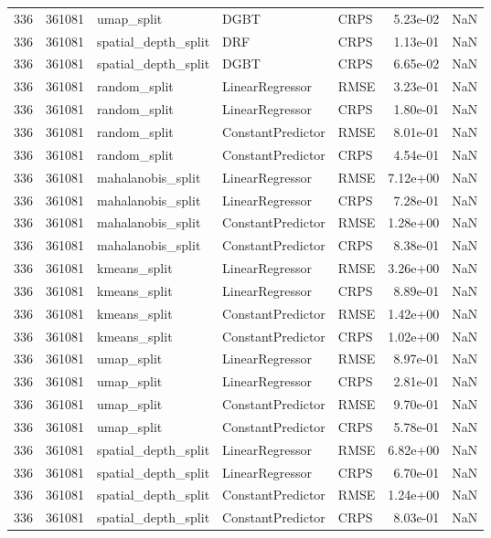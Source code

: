 \begin{tabular}{rrlllrr}
336 & 361081 & umap\_split & DGBT & CRPS & 5.23e-02 & NaN \\
336 & 361081 & spatial\_depth\_split & DRF & CRPS & 1.13e-01 & NaN \\
336 & 361081 & spatial\_depth\_split & DGBT & CRPS & 6.65e-02 & NaN \\
336 & 361081 & random\_split & LinearRegressor & RMSE & 3.23e-01 & NaN \\
336 & 361081 & random\_split & LinearRegressor & CRPS & 1.80e-01 & NaN \\
336 & 361081 & random\_split & ConstantPredictor & RMSE & 8.01e-01 & NaN \\
336 & 361081 & random\_split & ConstantPredictor & CRPS & 4.54e-01 & NaN \\
336 & 361081 & mahalanobis\_split & LinearRegressor & RMSE & 7.12e+00 & NaN \\
336 & 361081 & mahalanobis\_split & LinearRegressor & CRPS & 7.28e-01 & NaN \\
336 & 361081 & mahalanobis\_split & ConstantPredictor & RMSE & 1.28e+00 & NaN \\
336 & 361081 & mahalanobis\_split & ConstantPredictor & CRPS & 8.38e-01 & NaN \\
336 & 361081 & kmeans\_split & LinearRegressor & RMSE & 3.26e+00 & NaN \\
336 & 361081 & kmeans\_split & LinearRegressor & CRPS & 8.89e-01 & NaN \\
336 & 361081 & kmeans\_split & ConstantPredictor & RMSE & 1.42e+00 & NaN \\
336 & 361081 & kmeans\_split & ConstantPredictor & CRPS & 1.02e+00 & NaN \\
336 & 361081 & umap\_split & LinearRegressor & RMSE & 8.97e-01 & NaN \\
336 & 361081 & umap\_split & LinearRegressor & CRPS & 2.81e-01 & NaN \\
336 & 361081 & umap\_split & ConstantPredictor & RMSE & 9.70e-01 & NaN \\
336 & 361081 & umap\_split & ConstantPredictor & CRPS & 5.78e-01 & NaN \\
336 & 361081 & spatial\_depth\_split & LinearRegressor & RMSE & 6.82e+00 & NaN \\
336 & 361081 & spatial\_depth\_split & LinearRegressor & CRPS & 6.70e-01 & NaN \\
336 & 361081 & spatial\_depth\_split & ConstantPredictor & RMSE & 1.24e+00 & NaN \\
336 & 361081 & spatial\_depth\_split & ConstantPredictor & CRPS & 8.03e-01 & NaN \\

\end{tabular}
